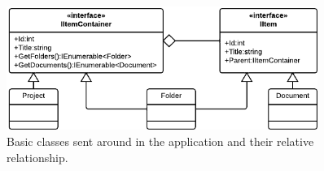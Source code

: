 \begin{figure}[htb]
	\centering
	\includegraphics[width=0.9\textwidth]{Software_architecture/graphics/basic-classes.png}
	\caption{Basic classes sent around in the application and their relative relationship.}
	\label{fig:basic-classes}
\end{figure}